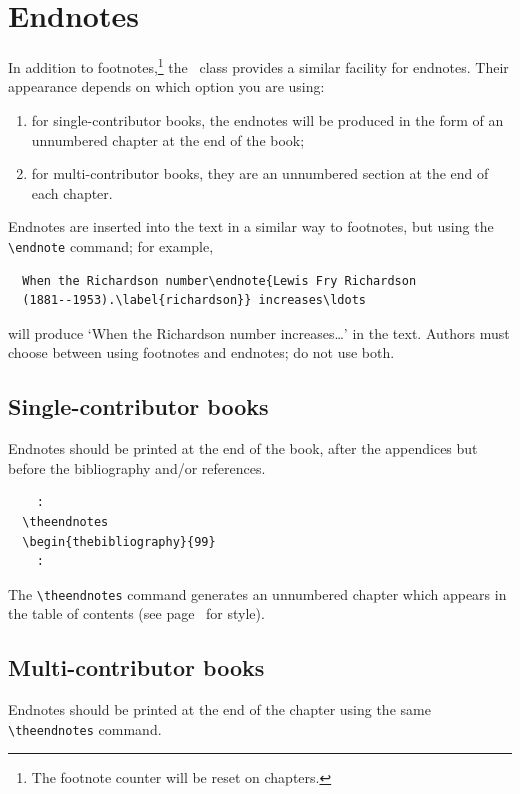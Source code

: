\section{Endnotes}

In addition to footnotes,\footnote{The footnote counter will be reset on chapters.} the \cambridge\ class provides a similar facility for endnotes. Their appearance depends on which option you are using:
\begin{enumerate}
\item for single-contributor books, the endnotes will be produced in the form of an unnumbered chapter at the end of the book;
\item for multi-contributor books, they are an unnumbered section at the end of each chapter.
\end{enumerate}
Endnotes are inserted into the text in a similar way to footnotes, but using the \verb"\endnote" command; for example,
\begin{verbatim}
  When the Richardson number\endnote{Lewis Fry Richardson
  (1881--1953).\label{richardson}} increases\ldots
\end{verbatim}
will produce `When the Richardson number increases\ldots' in the text. Authors must choose between using footnotes and endnotes; do not use both.

\subsection{Single-contributor books}
Endnotes should be printed at the end of the book, after the appendices but before the bibliography and/or references.
\begin{verbatim}
    :
  \theendnotes
  \begin{thebibliography}{99}
    :
\end{verbatim}
The \verb"\theendnotes" command generates an unnumbered chapter which appears in the table of contents (see page~\pageref{richardson} for style).

\subsection{Multi-contributor books}

Endnotes should be printed at the end of the chapter using the same \verb"\theendnotes" command.



